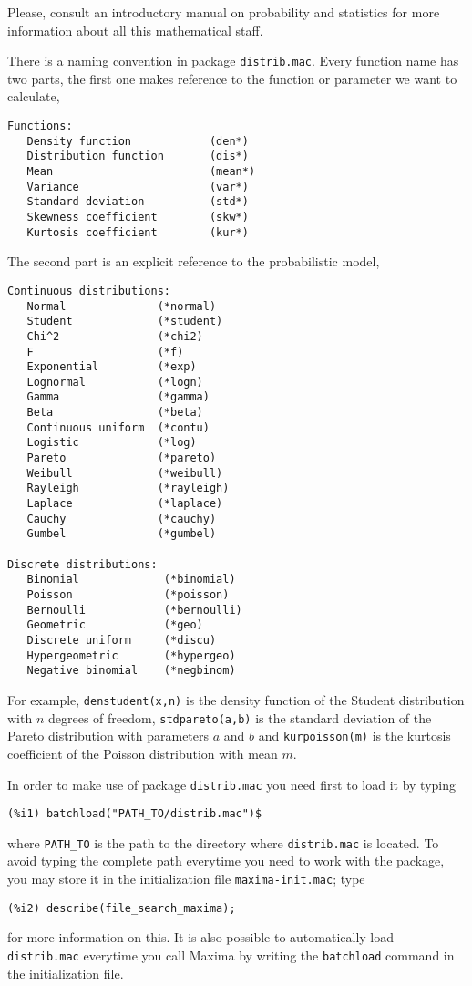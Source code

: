 \documentclass[12pt,a4paper]{article}
\begin{document}
Please, consult an introductory manual on probability and statistics for more information about all this mathematical staff.

There is a naming convention in package \verb|distrib.mac|. Every function name has two parts, the first one makes reference to the function or parameter we want to calculate,
\begin{verbatim}
Functions:
   Density function            (den*)
   Distribution function       (dis*)
   Mean                        (mean*)
   Variance                    (var*)
   Standard deviation          (std*)
   Skewness coefficient        (skw*)
   Kurtosis coefficient        (kur*)
\end{verbatim}

The second part is an explicit reference to the probabilistic model,
\begin{verbatim}
Continuous distributions:
   Normal              (*normal)
   Student             (*student)
   Chi^2               (*chi2)
   F                   (*f)
   Exponential         (*exp)
   Lognormal           (*logn)
   Gamma               (*gamma)
   Beta                (*beta)
   Continuous uniform  (*contu)
   Logistic            (*log)
   Pareto              (*pareto)
   Weibull             (*weibull)
   Rayleigh            (*rayleigh)
   Laplace             (*laplace)
   Cauchy              (*cauchy)
   Gumbel              (*gumbel)

Discrete distributions:
   Binomial             (*binomial)
   Poisson              (*poisson)
   Bernoulli            (*bernoulli)
   Geometric            (*geo)
   Discrete uniform     (*discu)
   Hypergeometric       (*hypergeo)
   Negative binomial    (*negbinom)
\end{verbatim}

For example, \verb|denstudent(x,n)| is the density function of the Student distribution with $n$ degrees of freedom, \verb|stdpareto(a,b)| is the standard deviation of the Pareto distribution with parameters $a$ and $b$ and \verb|kurpoisson(m)| is the kurtosis coefficient of the Poisson distribution with mean $m$.

In order to make use of package \verb|distrib.mac| you need first to load it by typing
\begin{verbatim}
(%i1) batchload("PATH_TO/distrib.mac")$
\end{verbatim}
where \verb|PATH_TO| is the path to the directory where \verb|distrib.mac| is located. To avoid typing the complete path everytime you need to work with the package, you may store it in the initialization file \verb|maxima-init.mac|; type
\begin{verbatim}
(%i2) describe(file_search_maxima);
\end{verbatim}
for more information on this. It is also possible to automatically load \verb|distrib.mac| everytime you call Maxima by writing the \verb|batchload| command in the initialization file.
\end{document}
